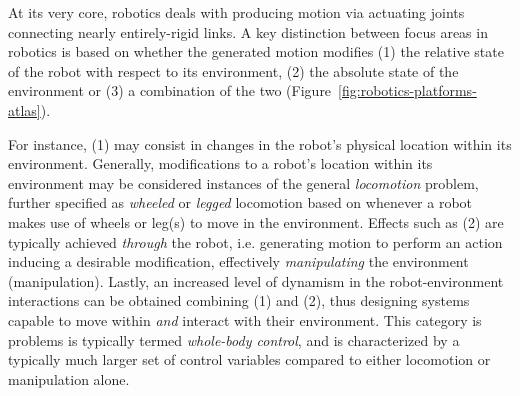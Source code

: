 At its very core, robotics deals with producing motion via actuating joints connecting nearly entirely-rigid links.
A key distinction between focus areas in robotics is based on whether the generated motion modifies (1) the relative state of the robot with respect to its environment, (2) the absolute state of the environment or (3) a combination of the two (Figure~\ref{fig:robotics-platforms-atlas}).

For instance, (1) may consist in changes in the robot's physical location within its environment.
Generally, modifications to a robot's location within its environment may be considered instances of the general \emph{locomotion} problem, further specified as \emph{wheeled} or \emph{legged} locomotion based on whenever a robot makes use of wheels or leg(s) to move in the environment.
Effects such as (2) are typically achieved \emph{through} the robot, i.e. generating motion to perform an action inducing a desirable modification, effectively \emph{manipulating} the environment (manipulation).
Lastly, an increased level of dynamism in the robot-environment interactions can be obtained combining (1) and (2), thus designing systems capable to move within \emph{and} interact with their environment.
This category is problems is typically termed \emph{whole-body control}, and is characterized by a typically much larger set of control variables compared to either locomotion or manipulation alone.


